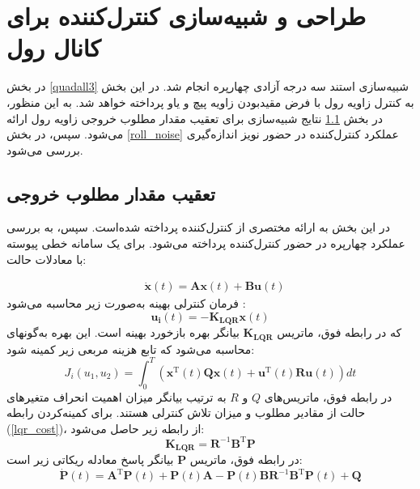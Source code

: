 \section{طراحی و شبیه‌سازی کنترل‌کننده برای کانال رول}\label{roll_lqr_section_simulation}
در بخش
\ref{quadall3}
شبیه‌سازی استند سه درجه آزادی چهارپره انجام شد.
در این بخش به کنترل زاویه رول با فرض مقید‌بودن زاویه پیچ و یاو پرداخته خواهد شد. به این منظور، در بخش
\ref{roll_regulator}
نتایج شبیه‌سازی برای تعقیب مقدار مطلوب خروجی زاویه رول ارائه می‌شود. سپس، در بخش
\ref{roll_noise}
عملکرد کنترل‌کننده در  حضور نویز اندازه‌گیری بررسی می‌شود.
\subsection{تعقیب مقدار مطلوب خروجی}\label{roll_regulator}


 در این بخش به ارائه مختصری از کنترل‌کننده  پرداخته شده‌است. سپس، به بررسی عملکرد چهارپره در حضور کنترل‌کننده  پرداخته می‌شود.
 برای یک سامانه خطی پیوسته با معادلات حالت:

\begin{equation}
	\begin{split}
		&\boldsymbol{\dot x}(t) = \boldsymbol{Ax}(t) + \boldsymbol{Bu}(t) %
	\end{split}
\end{equation}
فرمان کنترلی بهینه  به‌صورت زیر محاسبه می‌شود
\cite{ogata2010modern}:
\begin{equation}
		\boldsymbol{u_i}(t) = -\boldsymbol{K_{LQR}}\boldsymbol{x}(t)
\end{equation}
که در رابطه فوق، ماتریس $\boldsymbol{K_{LQR}}$ بیانگر بهره بازخورد بهینه است. این بهره به‌گونهای محاسبه می‌شود که تابع هزینه مربعی زیر کمینه شود:
 \begin{equation}\label{lqr_cost}
	J_i(u_1, u_2) = \int_{0}^{T}\left( \boldsymbol{x} ^\mathrm{T}(t) \boldsymbol{Q} \boldsymbol{x}(t)+
	\boldsymbol{u} ^\mathrm{T}(t) \boldsymbol{R} \boldsymbol{u}(t)
	\right)dt
\end{equation}
در رابطه فوق، ماتریس‌های $Q$ و $R$ به ترتیب بیانگر میزان اهمیت انحراف متغیرهای حالت از مقادیر مطلوب و میزان تلاش کنترلی هستند. برای کمینه‌کردن رابطه
(\ref{lqr_cost})،
از رابطه زیر حاصل می‌شود:
\begin{equation}
	\boldsymbol{K_{LQR}} = \boldsymbol{R}^{-1}\boldsymbol{B}^\mathrm{T}\boldsymbol{P}
\end{equation}
در رابطه فوق، ماتریس $\boldsymbol{P}$ بیانگر پاسخ معادله ریكاتی زیر است:
\begin{equation}
	\boldsymbol{\dot{P}}(t) = \boldsymbol{A}^\mathrm{T} \boldsymbol{P}(t)  + \boldsymbol{P}(t) \boldsymbol{A} - \boldsymbol{P}(t) \boldsymbol{B} \boldsymbol{R}^{-1}\boldsymbol{B}^\mathrm{T} \boldsymbol{P}(t) + \boldsymbol{Q}
\end{equation}


